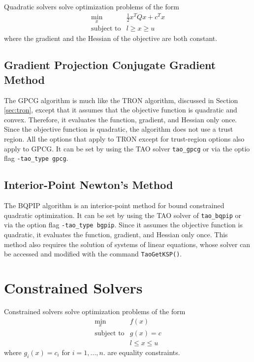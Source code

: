 Quadratic solvers solve optimization problems of the form
\[
\begin{array}{ll}
\displaystyle \min_{x} & \frac{1}{2}x^T Q x + c^T x \\
\mbox{subject to} & l \geq x \geq u
\end{array}
\]
where the gradient and the Hessian of the objective are both constant.

\subsection{Gradient Projection Conjugate Gradient Method}
The GPCG \cite{more-toraldo} algorithm is much like the TRON algorithm, discussed in
Section \ref{sec:tron}, except that
it assumes that the objective function is quadratic and convex.
Therefore, it evaluates the function, gradient, and Hessian only
once.
Since the objective function
is quadratic, the algorithm does not use a trust region.  
All the options that apply to TRON except for trust-region
options also apply to GPCG. It can be set by using the TAO solver 
{\tt tao\_gpcg} or via the optio flag {\tt -tao\_type gpcg}.

\subsection{Interior-Point Newton's Method}\label{sec:bqpip}
The BQPIP algorithm is an interior-point method for bound
constrained quadratic optimization.  It can be set by using the
TAO solver of {\tt tao\_bqpip} or via the option flag {\tt -tao\_type bgpip}.
Since it assumes the objective function is quadratic, 
it evaluates the function, gradient, and Hessian only once.
This method also requires the solution of systems of linear equations,
whose solver can be accessed and modified 
with the command {\tt Tao\-Get\-KSP()}.

\section{Constrained Solvers}

Constrained solvers solve optimization problems of the form
\[
\begin{array}{ll}
\displaystyle \min_{x} & f(x) \\
\mbox{subject to} & g(x) = c \\
                  & l \leq x \leq u
\end{array}
\]
where $g_i(x) = c_i$ for $i = 1,...,n$. are equality constraints.


